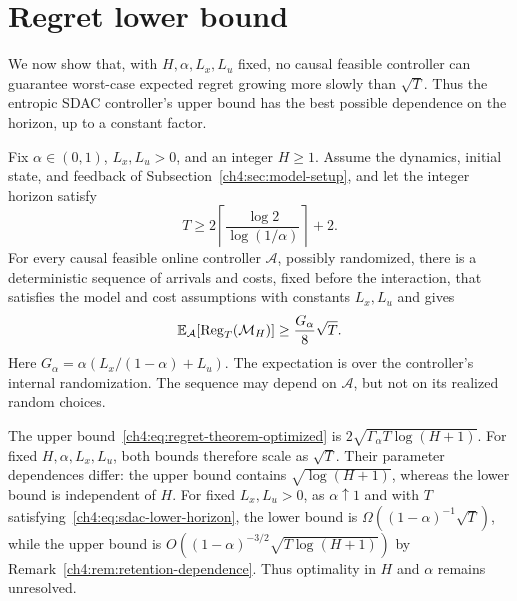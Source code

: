 \section{Regret lower bound}
\label{ch4:sec:regret-lower-bound}

We now show that, with $H,\alpha,L_x,L_u$ fixed, no causal feasible controller
can guarantee worst-case expected regret growing more slowly than $\sqrt T$.
Thus the entropic SDAC controller's upper bound has the best possible
dependence on the horizon, up to a constant factor.

\begin{Thm:Theorem}
\label{ch4:thm:sdac-lower-bound}
Fix $\alpha\in(0,1)$, $L_x,L_u>0$, and an integer $H\ge1$.
Assume the dynamics, initial state, and feedback of
Subsection~\ref{ch4:sec:model-setup}, and let the integer horizon satisfy
\begin{equation}
\label{ch4:eq:sdac-lower-horizon}
T\ge2\left\lceil\frac{\log2}{\log(1/\alpha)}\right\rceil+2.
\end{equation}
For every causal feasible online controller $\mathcal A$, possibly
randomized, there is a deterministic sequence of arrivals and costs,
fixed before the interaction, that satisfies the model and cost assumptions
with constants $L_x,L_u$ and gives
\begin{equation}
\label{ch4:eq:sdac-lower-large-horizon}
\mathbb E_{\mathcal A}\!\left[\mathrm{Reg}_T(\mathcal M_H)\right]
\ge\frac{G_\alpha}{8}\sqrt T.
\end{equation}
Here $G_\alpha=\alpha(L_x/(1-\alpha)+L_u)$.
The expectation is over the controller's internal randomization.
The sequence may depend on $\mathcal A$, but not on its realized random
choices.
\end{Thm:Theorem}

The upper bound~\eqref{ch4:eq:regret-theorem-optimized} is
$2\sqrt{\Gamma_\alpha T\log(H+1)}$. For fixed $H,\alpha,L_x,L_u$,
both bounds therefore scale as $\sqrt T$. Their parameter dependences
differ: the upper bound contains $\sqrt{\log(H+1)}$, whereas the lower
bound is independent of $H$. For fixed $L_x,L_u>0$, as $\alpha\uparrow1$
and with $T$ satisfying~\eqref{ch4:eq:sdac-lower-horizon}, the lower bound
is $\Omega((1-\alpha)^{-1}\sqrt T)$, while the upper bound is
$O((1-\alpha)^{-3/2}\sqrt{T\log(H+1)})$ by
Remark~\ref{ch4:rem:retention-dependence}. Thus optimality in $H$ and
$\alpha$ remains unresolved.

